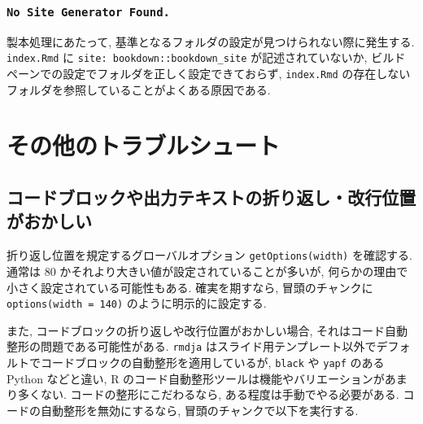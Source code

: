 \documentclass[
  xelatex,ja=standard,jafont=noto]{bxjsbook}
\newenvironment{Shaded}{\begin{snugshade}}{\end{snugshade}}
\newcommand{\AttributeTok}[1]{\textcolor[rgb]{0.77,0.63,0.00}{#1}}
\newcommand{\FunctionTok}[1]{\textcolor[rgb]{0.00,0.00,0.00}{#1}}
\newcommand{\NormalTok}[1]{#1}
\newcommand{\SpecialCharTok}[1]{\textcolor[rgb]{0.00,0.00,0.00}{#1}}
\theoremstyle{definition}
\theoremstyle{definition}
\theoremstyle{definition}
\theoremstyle{definition}
\theoremstyle{remark}
\begin{document}
\hypertarget{no-site-generator-found.}{%
\subsection{\texorpdfstring{\texttt{No\ Site\ Generator\ Found.}}{No Site Generator Found.}}\label{no-site-generator-found.}}

製本処理にあたって,
基準となるフォルダの設定が見つけられない際に発生する. \texttt{index.Rmd}
に \texttt{site:\ bookdown::bookdown\_site} が記述されていないか,
ビルドペーンでの設定でフォルダを正しく設定できておらず,
\texttt{index.Rmd}
の存在しないフォルダを参照していることがよくある原因である.

\hypertarget{ux305dux306eux4ed6ux306eux30c8ux30e9ux30d6ux30ebux30b7ux30e5ux30fcux30c8}{%
\chapter{その他のトラブルシュート}\label{ux305dux306eux4ed6ux306eux30c8ux30e9ux30d6ux30ebux30b7ux30e5ux30fcux30c8}}

\hypertarget{ux30b3ux30fcux30c9ux30d6ux30edux30c3ux30afux3084ux51faux529bux30c6ux30adux30b9ux30c8ux306eux6298ux308aux8fd4ux3057ux6539ux884cux4f4dux7f6eux304cux304aux304bux3057ux3044}{%
\section{コードブロックや出力テキストの折り返し・改行位置がおかしい}\label{ux30b3ux30fcux30c9ux30d6ux30edux30c3ux30afux3084ux51faux529bux30c6ux30adux30b9ux30c8ux306eux6298ux308aux8fd4ux3057ux6539ux884cux4f4dux7f6eux304cux304aux304bux3057ux3044}}

折り返し位置を規定するグローバルオプション \texttt{getOptions(width)}
を確認する. 通常は 80 かそれより大きい値が設定されていることが多いが,
何らかの理由で小さく設定されている可能性もある. 確実を期すなら,
冒頭のチャンクに \texttt{options(width\ =\ 140)}
のように明示的に設定する.

また, コードブロックの折り返しや改行位置がおかしい場合,
それはコード自動整形の問題である可能性がある. \texttt{rmdja}
はスライド用テンプレート以外でデフォルトでコードブロックの自動整形を適用しているが,
\texttt{black} や \texttt{yapf} のある Python などと違い, R
のコード自動整形ツールは機能やバリエーションがあまり多くない.
コードの整形にこだわるなら, ある程度は手動でやる必要がある.
コードの自動整形を無効にするなら, 冒頭のチャンクで以下を実行する.

\begin{Shaded}
\end{Shaded}
\end{document}
